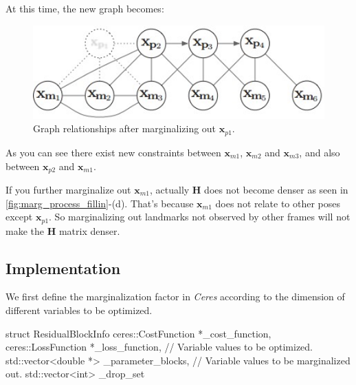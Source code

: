 \documentclass[12pt]{report}   %
\begin{document}
At this time, the new graph becomes:


\begin{figure}[H]
	\centering
	\includegraphics[width=.6\linewidth]{figures/after_marg.png}
	\caption{Graph relationships after marginalizing out $\bm{x}_{p1}$.}
	\label{fig:after_marg}
\end{figure}

As you can see there exist new constraints between $\bm{x}_{m1}$, $\bm{x}_{m2}$ and $\bm{x}_{m3}$, and also between $\bm{x}_{p2}$ and $\bm{x}_{m1}$.

If you further marginalize out $\bm{x}_{m1}$, actually $\bm{H}$ does not become denser as seen in \ref{fig:marg_process_fillin}-(d). That's because $\bm{x}_{m1}$ does not relate to other poses except $\bm{x}_{p1}$. So marginalizing out landmarks not observed by other frames will not make the $\bm{H}$ matrix denser. 



\subsection{Implementation}


We first define the marginalization factor in \textit{Ceres} according to the dimension of different variables to be optimized.

\begin{cppcode}
struct ResidualBlockInfo{
ceres::CostFunction *_cost_function, 
ceres::LossFunction *_loss_function,
// Variable values to be optimized.
std::vector<double *> _parameter_blocks, 
// Variable values to be marginalized out.
std::vector<int> _drop_set}

\end{cppcode}
\end{document}
